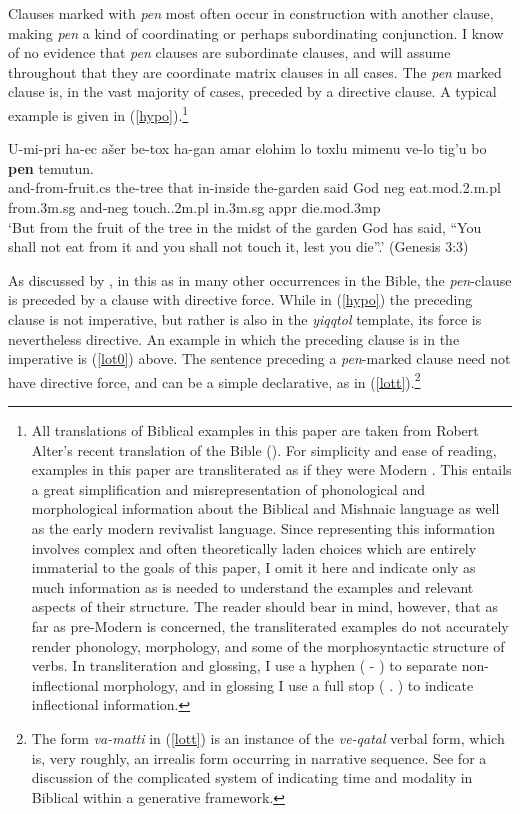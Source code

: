 \documentclass[output=paper,colorlinks,citecolor=brown]{langscibook}
\begin{document}
Clauses marked with \textit{pen} most often occur in construction with another clause, making \textit{pen} a kind of coordinating or perhaps subordinating conjunction. I know of no evidence that \textit{pen} clauses are subordinate clauses, and will assume throughout that they are coordinate matrix clauses in all cases. The \textit{pen} marked clause is, in the vast majority of cases, preceded by a directive clause. A typical example is given in (\ref{hypo}).\footnote{All translations of Biblical examples in this paper are taken from Robert Alter's recent translation of the  Bible (\citealt{alter18}). For simplicity and ease of reading,  examples in this paper are transliterated as if they were Modern . This entails a great simplification and misrepresentation of phonological and morphological information about the Biblical and Mishnaic language as well as the early modern revivalist language. Since representing this information involves complex and often theoretically laden choices which are entirely immaterial to the goals of this paper, I omit it here and indicate only as much information as is needed to understand the examples and relevant aspects of their structure. The reader should bear in mind, however, that as far as pre-Modern  is concerned, the transliterated examples do not accurately render phonology, morphology, and some of the morphosyntactic structure of verbs. In transliteration and glossing, I use a hyphen ( - ) to separate non-inflectional morphology, and in glossing I use a full stop ( . )  to indicate inflectional information.}

\ea
\label{hypo} 
\gll U-mi-pri ha-ec ašer be-tox ha-gan amar elohim lo toxlu mimenu ve-lo tig'u bo \textbf{pen} temutun. \\
and-from-fruit.{\sc cs} the-tree that in-inside the-garden said God {\sc neg} eat.{\sc mod.2.m.pl} from.{\sc 3m.sg} and-{\sc neg} touch..2{\sc m.pl} in.{\sc 3m.sg} {\sc appr} die.{\sc mod.3mp} \\
\glt `But from the fruit of the tree in the midst of the garden God has said, ``You shall not eat from it and you shall not touch it, lest you die''.' (Genesis 3:3)
\z 

As discussed by \citet{azar81}, in this as in many other occurrences in the  Bible, the \textit{pen}-clause is preceded by a clause with directive force. While in (\ref{hypo}) the preceding clause is not imperative, but rather is also in the \textit{yiqqtol} template, its force is nevertheless directive. An example in which the preceding clause is in the imperative is (\ref{lot0}) above. The sentence preceding a \textit{pen}-marked clause need not have directive force, and can be a simple declarative, as in (\ref{lott}).\footnote{The form \textit{va-matti} in (\ref{lott}) is an instance of the \textit{ve-qatal} verbal form, which is, very roughly, an irrealis form occurring in narrative sequence. See \citet{hatav-book} for a discussion of the complicated system of indicating time and modality in Biblical  within a generative framework.}
\end{document}
